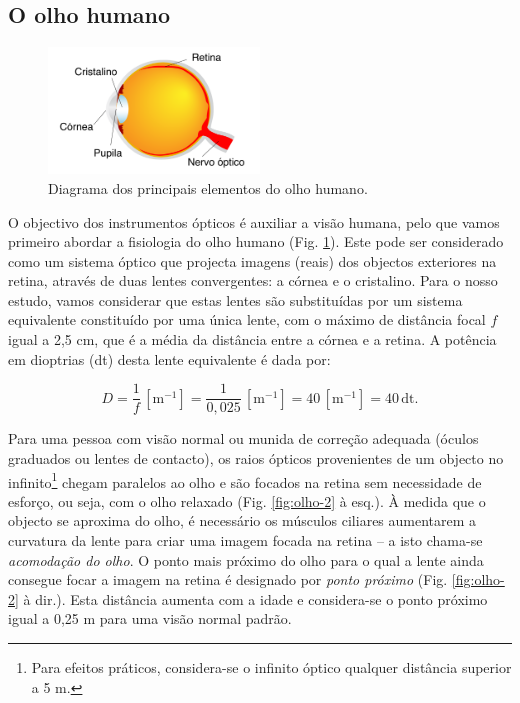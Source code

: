 \documentclass[a4paper,12pt]{article}      %
\begin{document}
\subsection{\sf O olho humano}

\begin{figure}
	[!htb]  \centering 
	\includegraphics[width=0.5\textwidth]{olho-1}
	\caption{Diagrama dos principais elementos do olho humano. \label{fig:olho-1}} 
\end{figure}

O objectivo dos instrumentos ópticos é auxiliar a visão humana, pelo que vamos primeiro abordar a fisiologia do olho humano (Fig. \ref{fig:olho-1}). Este pode ser considerado como um sistema óptico que projecta imagens (reais) dos objectos exteriores na retina, através de duas lentes convergentes: a córnea e o cristalino. Para o nosso estudo, vamos considerar que estas lentes são substituídas por um sistema equivalente constituído por uma única lente, com o máximo de distância focal $f$ igual a 2,5 cm, que é a média da distância entre a córnea e a retina. A potência em dioptrias (dt) desta lente equivalente é dada por:

\begin{equation}
D=\frac{1}{f} \,[\mathrm{m}^{-1}] = \frac{1}{0,025} \,[\mathrm{m}^{-1}] = 40 \,[\mathrm{m}^{-1}]=40\, \mathrm{dt}.
\end{equation}


Para uma pessoa com visão normal ou munida de correção adequada (óculos graduados ou lentes de contacto), os raios ópticos provenientes de um objecto no infinito\footnote{Para efeitos práticos, considera-se o infinito óptico qualquer distância superior a 5 m.} chegam paralelos ao olho e são focados na retina sem necessidade de esforço, ou seja, com o olho relaxado (Fig. \ref{fig:olho-2} à esq.). À medida que o objecto se aproxima do olho, é necessário os músculos ciliares aumentarem a curvatura da lente para criar uma imagem focada na retina -- a isto chama-se \emph{acomodação do olho}. O ponto mais próximo do olho para o qual a lente ainda consegue focar a imagem na retina é designado por \emph{ponto próximo} (Fig. \ref{fig:olho-2} à dir.). Esta distância aumenta com a idade e considera-se o ponto próximo igual a 0,25 m para uma visão normal padrão.
\end{document}
